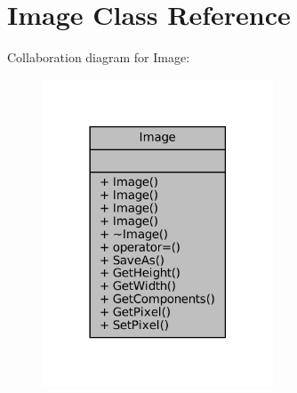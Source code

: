 \hypertarget{classImage}{}\section{Image Class Reference}
\label{classImage}


Collaboration diagram for Image\+:\nopagebreak
\begin{figure}[H]
\begin{center}
\leavevmode
\includegraphics[width=194pt]{classImage__coll__graph}
\end{center}
\end{figure}

